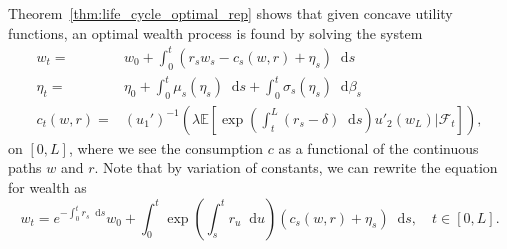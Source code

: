 \documentclass[11pt,oneside,english,reqno,dvipsnames,table]{amsart}
\numberwithin{equation}{section}
\theoremstyle{plain}
\theoremstyle{definition}
\theoremstyle{remark}
\theoremstyle{plain}
\theoremstyle{plain}
\theoremstyle{plain}
\theoremstyle{plain}
\theoremstyle{plain}
\theoremstyle{plain}
\theoremstyle{plain}
\newcommand{\cF}{\mathcal{F}}
\newcommand{\EE}{\mathbb{E}}
\newcommand{\dd}{\mathop{}\!\mathrm{d}}
\numberwithin{thm}{section}
\begin{document}
Theorem~\ref{thm:life_cycle_optimal_rep} shows that given concave utility functions, an optimal wealth process is found by solving the system 
%
\begin{equation}\label{eq:triple_equations}
    \begin{aligned}
        w_t =&w_0 + \int_0^t \left(r_s w_s -c_s(w,r) +\eta_s \right)\dd s 
        \\
      \eta_t = &\eta_0 + \int_0^t \mu_s(\eta_s) \dd s +  \int_0^t\sigma_s(\eta_s)\dd   \beta_s 
        \\
        c_t(w,r) = & (u_1')^{-1}\left(\lambda \EE\left[\exp\left(\int_t^L (r_s-\delta)\dd s\right) u'_2(w_L)|\cF_t\right]\right),
    \end{aligned}
\end{equation}
%
on $[0,L]$, where we see the consumption $c$ as a functional of the continuous paths $w$ and $r$. 
Note that by variation of constants, we can rewrite the equation for wealth as
%
\begin{equation*}
w_t =  e^{-\int_0^tr_s \dd s} w_0 + \int_0^t \exp\left(\int_{s}^t r_u \dd u\right)\left(c_s(w,r) +\eta_s\right) \dd s,\quad t\in [0,L].
\end{equation*}
\end{document}

